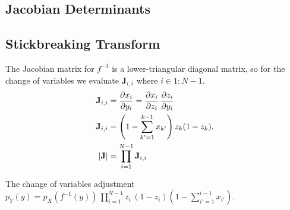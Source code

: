 \begin{appendices}

\section{Jacobian Determinants}
\subsection{Stickbreaking Transform}
The Jacobian matrix for $f^{-1}$ is a lower-triangular diagonal matrix, so for the change of variables we evaluate $\mathbf{J}_{i, i}$ where $i \in 1:N-1$.
\begin{align*}
\mathbf{J}_{i, i} &= \frac{\partial x_i}{\partial y_i}
=
\frac{\partial x_i}{\partial z_i} \,
\frac{\partial z_i}{\partial y_i}\\
\mathbf{J}_{i, i} &= \left(
  1 - \sum_{k' = 1}^{k-1} x_{k'}
   \right) z_k (1 - z_k),\\
   \left| \textbf{J} \right| &= \prod_{i=1}^{N-1} \textbf{J}_{i,i}
\end{align*}

The change of variables adjustment $p_Y(y) = p_X(f^{-1}(y))\,
\prod_{i=1}^{N-1}z_i\,(1 - z_i)\left(1 - \sum_{i'=1}^{i-1} x_{i'}\right).$


\end{appendices}
